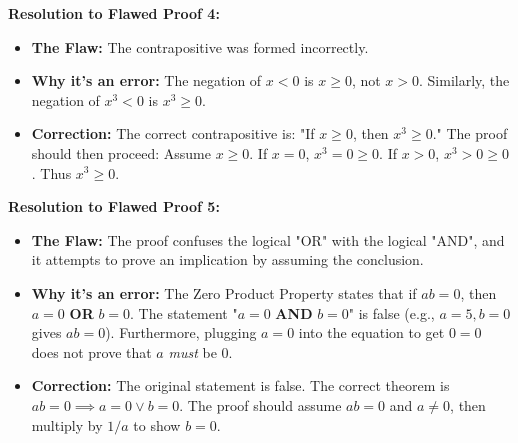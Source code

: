 \documentclass[11pt]{article}
\begin{document}
\textbf{Resolution to Flawed Proof 4:}
\begin{itemize}
    \item \textbf{The Flaw:} The contrapositive was formed incorrectly.
    \item \textbf{Why it's an error:} The negation of $x < 0$ is $x \ge 0$, not $x > 0$. Similarly, the negation of $x^3 < 0$ is $x^3 \ge 0$.
    \item \textbf{Correction:} The correct contrapositive is: "If $x \ge 0$, then $x^3 \ge 0$." The proof should then proceed: Assume $x \ge 0$. If $x = 0$, $x^3 = 0 \ge 0$. If $x > 0$, $x^3 > 0 \ge 0$. Thus $x^3 \ge 0$.
\end{itemize}

\textbf{Resolution to Flawed Proof 5:}
\begin{itemize}
    \item \textbf{The Flaw:} The proof confuses the logical "OR" with the logical "AND", and it attempts to prove an implication by assuming the conclusion.
    \item \textbf{Why it's an error:} The Zero Product Property states that if $ab = 0$, then $a = 0$ \textbf{OR} $b = 0$. The statement "$a=0$ \textbf{AND} $b=0$" is false (e.g., $a=5, b=0$ gives $ab=0$). Furthermore, plugging $a=0$ into the equation to get $0=0$ does not prove that $a$ \textit{must} be $0$.
    \item \textbf{Correction:} The original statement is false. The correct theorem is $ab = 0 \implies a = 0 \lor b = 0$. The proof should assume $ab = 0$ and $a \neq 0$, then multiply by $1/a$ to show $b = 0$.
\end{itemize}
\end{document}
